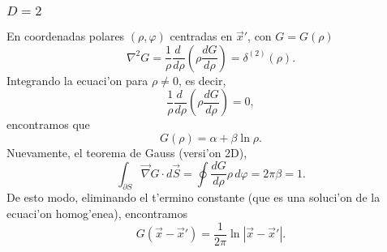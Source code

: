 \subsubsection{$D=2$}
En coordenadas polares $(\rho,\varphi)$ centradas en $\vec{x}'$, con $G=G(\rho)$
\begin{equation}
\nabla^2G=\frac{1}{\rho}\frac{d\ }{d\rho}\left(\rho\frac{dG}{d\rho}\right)=\delta^{(2)}(\rho).
\end{equation}
Integrando la ecuaci'on para $\rho\neq 0$, es decir,
\begin{equation}
\frac{1}{\rho}\frac{d\ }{d\rho}\left(\rho\frac{dG}{d\rho}\right)=0,
\end{equation}
encontramos que
\begin{equation}
G(\rho)=\alpha+\beta\ln\rho.
\end{equation}
Nuevamente, el teorema de Gauss (versi'on 2D), 
\begin{equation}
\int_{\partial S}\vec\nabla G\cdot d\vec{S}=\oint\frac{dG}{d\rho}\rho\,d\varphi=2\pi\beta=1.
\end{equation}
De esto modo, eliminando el t'ermino constante (que es una soluci'on de la ecuaci'on homog'enea), encontramos
\begin{equation}
\boxed{G(\vec{x}-\vec{x}')=\frac{1}{2\pi}\ln{|\vec{x}-\vec{x}'|}.}
\end{equation}


